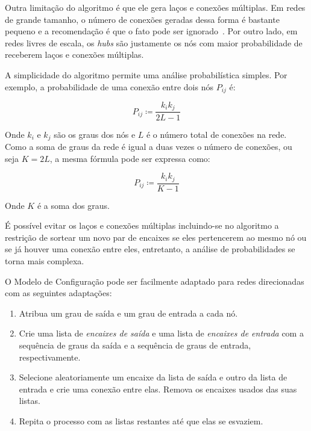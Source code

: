 \documentclass[12pt,a4paper]{article}
\theoremstyle{hypo}
\newcommand{\defn}{\coloneqq} %
\begin{document}
Outra limitação do algoritmo é que ele gera laços e conexões múltiplas. Em redes de grande tamanho, o número de conexões geradas dessa forma é bastante pequeno e a recomendação é que o fato pode ser ignorado~\cite{Barabasi2016-rn}. Por outro lado, em redes livres de escala, os \textit{hubs} são justamente os nós com maior probabilidade de receberem laços e conexões múltiplas.

A simplicidade do algoritmo permite uma análise probabilística simples. Por exemplo, a probabilidade de uma conexão entre dois nós $P_{ij}$ é:

\begin{equation} \label{eq:probabilidade-conexao}
P_{ij} \defn \frac{k_i k_j}{2L - 1}
\end{equation}


Onde $k_i$ e $k_j$ são os graus dos nós e $L$ é o número total de conexões na rede. Como a soma de graus da rede é igual a duas vezes o número de conexões, ou seja $K = 2L$, a mesma fórmula pode ser expressa como:

\begin{equation}
P_{ij} \defn \frac{k_i k_j}{K - 1}
\end{equation}

Onde $K$ é a soma dos graus.

É possível evitar os laços e conexões múltiplas incluindo-se no algoritmo a restrição de sortear um novo par de encaixes se eles pertencerem ao mesmo nó ou se já houver uma conexão entre eles, entretanto, a análise de probabilidades se torna mais complexa.

O Modelo de Configuração pode ser facilmente adaptado para redes direcionadas com as seguintes adaptações:

\begin{enumerate}
\item Atribua um grau de saída e um grau de entrada a cada nó.
\item Crie uma lista de \textit{encaixes de saída} e uma lista de \textit{encaixes de entrada} com a sequência de graus da saída e a sequência de graus de entrada, respectivamente.
\item Selecione aleatoriamente um encaixe da lista de saída e outro da lista de entrada e crie uma conexão entre elas. Remova os encaixes usados das suas listas.
\item Repita o processo com as listas restantes até que elas se esvaziem.
\end{enumerate}
\end{document}
